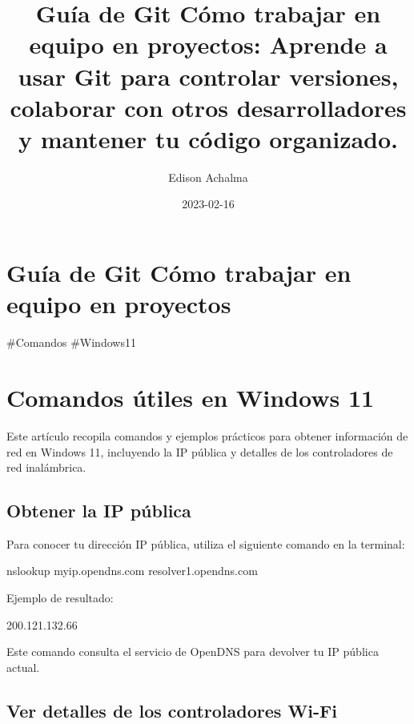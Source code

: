 \documentclass[
  doc,
  floatsintext,
  longtable,
  a4paper,
  nolmodern,
  notxfonts,
  notimes,
  colorlinks=true,linkcolor=blue,citecolor=blue,urlcolor=blue]{apa7}
\title{Guía de Git Cómo trabajar en equipo en proyectos: Aprende a usar
Git para controlar versiones, colaborar con otros desarrolladores y
mantener tu código organizado.}
\author{Edison Achalma}
\affiliation{
{Escuela Profesional de Economía, Universidad Nacional de San Cristóbal
de Huamanga}}
\date{2023-02-16}
\newenvironment{Shaded}{\begin{snugshade}}{\end{snugshade}}
\newcommand{\NormalTok}[1]{\textcolor[rgb]{0.00,0.23,0.31}{#1}}
\begin{document}
\maketitle

\hypertarget{toc}{}
\tableofcontents
\newpage
\section[Introduction]{Guía de Git Cómo trabajar en equipo en proyectos}

\setcounter{secnumdepth}{-\maxdimen} %

\setlength\LTleft{0pt}


\#Comandos \#Windows11

\section{Comandos útiles en Windows
11}\label{comandos-uxfatiles-en-windows-11}

Este artículo recopila comandos y ejemplos prácticos para obtener
información de red en Windows 11, incluyendo la IP pública y detalles de
los controladores de red inalámbrica.

\subsection{Obtener la IP pública}\label{obtener-la-ip-puxfablica}

Para conocer tu dirección IP pública, utiliza el siguiente comando en la
terminal:

\begin{Shaded}
\begin{Highlighting}[]
\NormalTok{nslookup myip.opendns.com resolver1.opendns.com}
\end{Highlighting}
\end{Shaded}

Ejemplo de resultado:

\begin{Shaded}
\begin{Highlighting}[]
\NormalTok{200.121.132.66}
\end{Highlighting}
\end{Shaded}

Este comando consulta el servicio de OpenDNS para devolver tu IP pública
actual.

\subsection{Ver detalles de los controladores
Wi-Fi}\label{ver-detalles-de-los-controladores-wi-fi}
\end{document}
